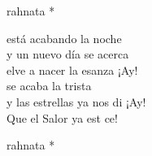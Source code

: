 \begin{cancion}
\begin{chorus}
		rahnata *\jump\\
	\end{chorus}%
	 está acabando la noche\\
	\jump
y un nuevo día se acerca\\
	elve a nacer la esanza ¡Ay!\\
	se acaba la trista\\
	y las estrellas ya nos di ¡Ay!\\
	Que el Salor ya est ce!\jump\\
	\begin{chorus}%
		rahnata *\jump\\
	\end{chorus}%
\end{cancion}%
